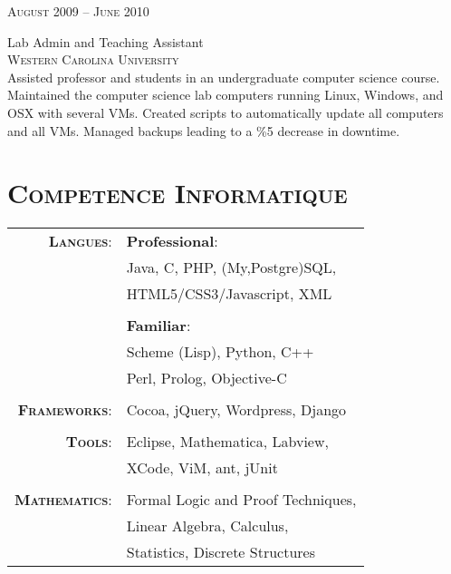 \documentclass[10pt]{article}
\begin{document}
\begin{minipage}[t]{0.5\textwidth}
   \raggedleft
   \textsc{\normalsize August 2009 -- June 2010}\par
   \raggedright\large Lab Admin and Teaching Assistant\\ 
   \textsc{Western Carolina University}\\
   \normalsize{Assisted professor and students in an undergraduate computer science course. Maintained the computer science lab computers running Linux, Windows, and OSX with several VMs. Created scripts to automatically update all computers and all VMs. Managed backups leading to a \%5 decrease in downtime.}\\[5pt]

\section{\textsc{Competence Informatique}}
   \begin{tabular}{rl}
      \textbf{\textsc{Langues}}:
                        & \textbf{Professional}:\\
                        & Java, C, PHP, (My,Postgre)SQL, \\
                        & HTML5/CSS3/Javascript, XML\\
                        & \\
                        & \textbf{Familiar}:\\
                        & Scheme (Lisp), Python, C++\\
                        & Perl, Prolog, Objective-C\\
                        & \\
      \textbf{\textsc{Frameworks}}:
                        & Cocoa, jQuery, Wordpress, Django\\
                        & \\
      \textbf{\textsc{Tools}}:
                        & Eclipse, Mathematica, Labview,\\
                        & XCode, ViM, ant, jUnit\\
                        & \\
      \textbf{\textsc{Mathematics}}:
                        & Formal Logic and Proof Techniques,\\
                        & Linear Algebra, Calculus,\\
                        & Statistics, Discrete Structures\\
\end{tabular}
\end{minipage} %
\end{document}
